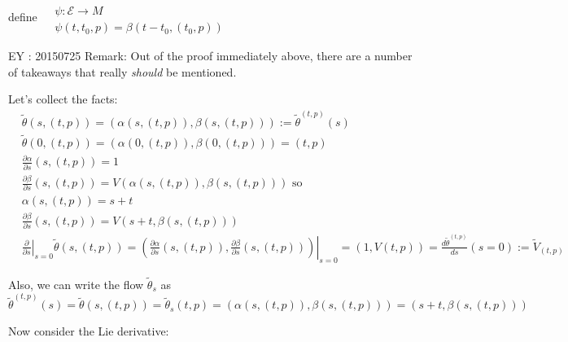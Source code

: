 \documentclass[11pt]{amsart}
\theoremstyle{definition}
\begin{document}
define $\begin{aligned} & \quad \\
  & \psi : \mathcal{E} \to M \\
  & \psi(t,t_0,p) = \beta(t-t_0,(t_0,p))
\end{aligned}$

EY : 20150725 Remark: Out of the proof immediately above, there are a number of takeaways that really \emph{should} be mentioned.

Let's collect the facts:
\[
\begin{aligned}
  & \widetilde{\theta}(s,(t,p)) = (\alpha(s,(t,p)), \beta(s,(t,p)) ) := \widetilde{\theta}^{(t,p)}(s) \\
  & \widetilde{\theta}(0,(t,p)) = (\alpha(0,(t,p)), \beta(0,(t,p)) ) = (t,p) \\
  & \frac{ \partial \alpha}{ \partial s}(s,(t,p)) = 1 \\
  & \frac{ \partial \beta }{ \partial s}(s,(t,p)) = V(\alpha(s,(t,p)), \beta(s,(t,p))) \text{ so } \\
  & \alpha(s,(t,p)) = s+t \\
  & \frac{ \partial \beta}{ \partial s}(s,(t,p)) = V(s+t,\beta(s,(t,p)) ) \\
  & \left. \frac{ \partial }{ \partial s} \right|_{s=0} \widetilde{\theta}(s,(t,p)) = \left. \left( \frac{ \partial \alpha }{ \partial s}(s,(t,p)) , \frac{ \partial \beta}{ \partial s}(s,(t,p)) \right) \right|_{s=0} = (1,V(t,p)) = \frac{d\widetilde{\theta}^{(t,p)}}{ds}(s=0) := \widetilde{V}_{(t,p)}
\end{aligned}
\]

Also, we can write the flow $\widetilde{\theta}_s$ as
\[
\widetilde{\theta}^{(t,p)}(s) = \widetilde{\theta}(s,(t,p)) = \widetilde{\theta}_s(t,p) = (\alpha(s,(t,p)),\beta(s,(t,p))) = (s+t, \beta(s,(t,p)))
\]

Now consider the Lie derivative:
\end{document}
